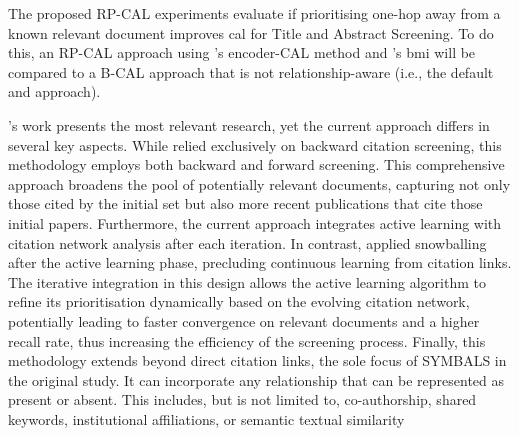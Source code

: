 \documentclass[10pt,oneside]{book}
\begin{document}
%     

The proposed RP-CAL experiments evaluate if prioritising one-hop away from a known relevant document improves \gls*{cal} for Title and Abstract Screening. To do this, an RP-CAL approach using \cite{mao_reproducibility_2024}'s encoder-CAL method and \cite{cormack_scalability_2016}'s \gls*{bmi} will be compared to a B-CAL approach that is not relationship-aware (i.e., the default \cite{mao_reproducibility_2024} and \cite{cormack_scalability_2016} approach).   

\cite{van_haastrecht_symbals_2021}'s work presents the most relevant research, yet the current approach differs in several key aspects. While \cite{van_haastrecht_symbals_2021} relied exclusively on backward citation screening, this methodology employs both backward and forward screening. This comprehensive approach broadens the pool of potentially relevant documents, capturing not only those cited by the initial set but also more recent publications that cite those initial papers. Furthermore, the current approach integrates active learning with citation network analysis after each iteration. In contrast, \cite{van_haastrecht_symbals_2021} applied snowballing after the active learning phase, precluding continuous learning from citation links. The iterative integration in this design allows the active learning algorithm to refine its prioritisation dynamically based on the evolving citation network, potentially leading to faster convergence on relevant documents and a higher recall rate, thus increasing the efficiency of the screening process. Finally, this methodology extends beyond direct citation links, the sole focus of SYMBALS in the original study. It can incorporate any relationship that can be represented as present or absent. This includes, but is not limited to, co-authorship, shared keywords, institutional affiliations, or semantic textual similarity
\end{document}
